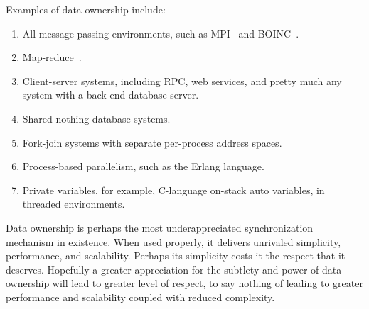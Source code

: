 Examples of data ownership include:

\begin{enumerate}
\item	All message-passing environments, such as MPI~\cite{MPIForum2008}
	and BOINC~\cite{BOINC2008}.
\item	Map-reduce~\cite{MapReduce2008MIT}.
\item	Client-server systems, including RPC, web services, and
	pretty much any system with a back-end database server.
\item	Shared-nothing database systems.
\item	Fork-join systems with separate per-process address spaces.
\item	Process-based parallelism, such as the Erlang language.
\item	Private variables, for example, C-language on-stack auto variables,
	in threaded environments.
\end{enumerate}

Data ownership is perhaps the most underappreciated synchronization
mechanism in existence.
When used properly, it delivers unrivaled simplicity, performance,
and scalability.
Perhaps its simplicity costs it the respect that it deserves.
Hopefully a greater appreciation for the subtlety and power of data ownership
will lead to greater level of respect, to say nothing of leading to
greater performance and scalability coupled with reduced complexity.

